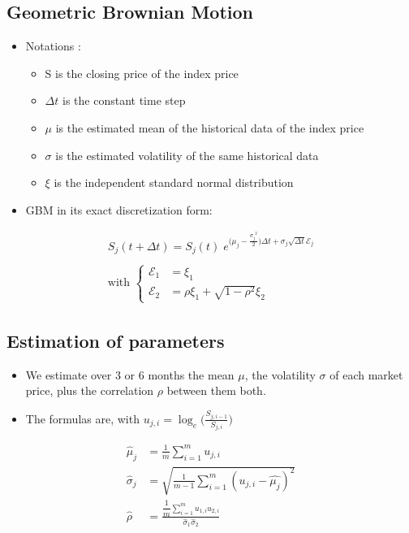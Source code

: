 \subsection{Geometric Brownian Motion}
\begin{frame}
\myframetitle{}
\begin{itemize}
  \item Notations :
	\begin{itemize}
		\item S is the closing price of the index price%
		\item $\Delta t$ is the constant time step%
		\item $\mu$ is the estimated mean of the historical data of the index price
		\item $\sigma$ is the estimated volatility of the same historical data
		\item $\xi$ is the independent standard normal distribution
	\end{itemize}
	\item GBM in its exact discretization form:
\end{itemize}
\begin{gather*}
	S_j(t+\Delta t) = S_j(t) \;
		e^{\bigl(\mu_j-\frac{{\sigma_j}^2}{2}\bigr)\Delta t+\sigma_j \sqrt{\Delta t}\mathcal{E}_j} 
	\\
	\\
	\mbox{with }
	\left \{
	\begin{array}{ll}
    \mathcal{E}_1 & = \xi_1 \\
    \mathcal{E}_2 & = \rho\xi_1 + \sqrt{1-\rho^2}\xi_2
  \end{array}
	\right.
\end{gather*}
\end{frame}

\subsection{Estimation of parameters}
\begin{frame}
\myframetitle{}
\begin{itemize}
	\item We estimate over 3 or 6 months the mean $\mu$, the volatility $\sigma$ of each market price, plus the correlation $\rho$ between them both.
	\item The formulas are, with $u_{j,i} = \log_e\bigl(\frac{S_{j,i-1}}{S_{j,i}}\bigr)$
\end{itemize}
\begin{align*}
	\hat{\mu}_j    &= \frac{1}{m} \sum_{i=1}^m u_{j,i} \\
	\hat{\sigma}_j &= \sqrt{\frac{1}{m-1} \sum_{i=1}^m (u_{j,i}-\hat{\mu_j})^2} \\
	\hat{\rho}   \;&= \frac{\dfrac{1}{m}\sum_{i=1}^m u_{1,i}u_{2,i}}{\hat{\sigma}_1 \hat{\sigma}_2}
\end{align*}
\end{frame}
